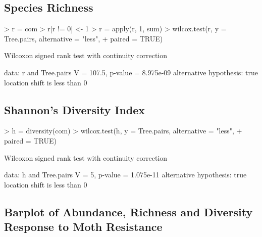 \documentclass[a4paper]{article}
\begin{document}
\subsection{Species Richness}

\begin{Schunk}
\begin{Sinput}
> r = com
> r[r != 0] <- 1
> r = apply(r, 1, sum)
> wilcox.test(r, y = Tree.pairs, alternative = "less", 
+     paired = TRUE)
\end{Sinput}
\begin{Soutput}
	Wilcoxon signed rank test with continuity correction

data:  r and Tree.pairs 
V = 107.5, p-value = 8.975e-09
alternative hypothesis: true location shift is less than 0 
\end{Soutput}
\end{Schunk}

\subsection{Shannon's Diversity Index}

\begin{Schunk}
\begin{Sinput}
> h = diversity(com)
> wilcox.test(h, y = Tree.pairs, alternative = "less", 
+     paired = TRUE)
\end{Sinput}
\begin{Soutput}
	Wilcoxon signed rank test with continuity correction

data:  h and Tree.pairs 
V = 5, p-value = 1.075e-11
alternative hypothesis: true location shift is less than 0 
\end{Soutput}
\end{Schunk}

\subsection{Barplot of Abundance, Richness and Diversity Response to Moth Resistance}
\end{document}
